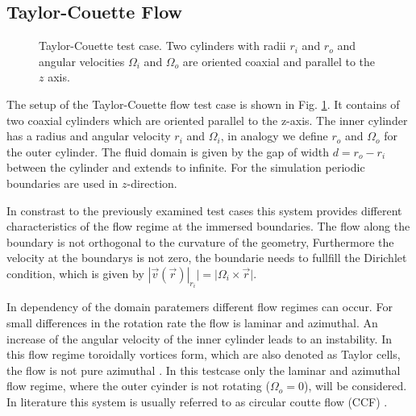 \subsection{Taylor-Couette Flow}

\begin{figure}[!bp]
  \begin{minipage}[c]{0.6\textwidth}
      \centering
  \end{minipage}
  \begin{minipage}[c]{0.3\textwidth}
      \caption{Taylor-Couette test case. Two cylinders with radii $r_i$ and $r_o$ and angular velocities $\Omega_i$ and $\Omega_o$ are oriented coaxial and parallel to the
      $z$ axis.
      \label{validation:setup_tcflow}
      }
  \end{minipage}
\end{figure}

The setup of the Taylor-Couette flow test case is shown in Fig. \ref{validation:setup_tcflow}.
It contains of two coaxial cylinders which are oriented parallel to the z-axis.
The inner cylinder has a radius and angular velocity $r_i$ and $\Omega_i$, in analogy we define
$r_o$ and $\Omega_o$ for the outer cylinder.
The fluid domain is given by the gap of width $d = r_o - r_i$ between the cylinder and extends to infinite.
For the simulation  periodic boundaries are used in $z$-direction.

In constrast to the previously examined test cases this system provides different characteristics
of the flow regime at the immersed boundaries. The flow along the boundary is not orthogonal to the curvature of the geometry,
Furthermore the velocity at the boundarys is not zero, the boundarie needs to fullfill the Dirichlet condition, which is given by
$|\vec{v}(\vec{r})|_{r_i} | = |\Omega_i \times \vec{r}|$.

In dependency of the domain paratemers different flow regimes can occur.
For small differences in the rotation rate the flow is laminar and azimuthal.
An increase of the angular velocity of the inner cylinder leads to an instability.
In this flow regime toroidally vortices form, which are also denoted as Taylor cells,
the flow is not pure azimuthal \citep{tritton88}.
In this testcase only the laminar and azimuthal flow regime, where the outer cyinder is not rotating ($\Omega_o = 0$), will be considered.
In literature this system is usually referred to as circular coutte flow (CCF) \citep{Kundu2012}.


